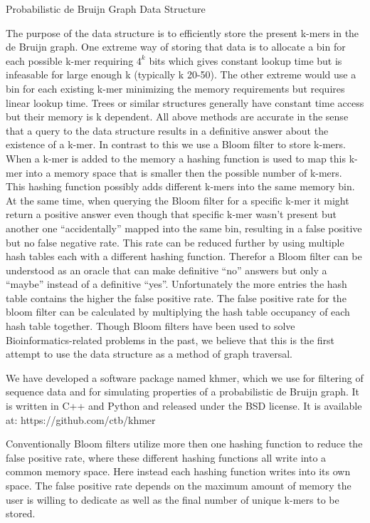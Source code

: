 \documentclass[12pt]{article} \usepackage{simplemargins}
\begin{document}
Probabilistic de Bruijn Graph Data Structure

The purpose of the data structure is to efficiently store the present
k-mers in the de Bruijn graph. One extreme way of storing that data is
to allocate a bin for each possible k-mer requiring $4^k$ bits which
gives constant lookup time but is infeasable for large enough k
(typically k 20-50). The other extreme would use a bin for each
existing k-mer minimizing the memory requirements but requires linear
lookup time. Trees or similar structures generally have constant time
access but their memory is k dependent. All above methods are accurate
in the sense that a query to the data structure results in a
definitive answer about the existence of a k-mer.  In contrast to this
we use a Bloom filter to store k-mers. When a k-mer is added to the
memory a hashing function is used to map this k-mer into a memory
space that is smaller then the possible number of k-mers. This hashing
function possibly adds different k-mers into the same memory bin. At
the same time, when querying the Bloom filter for a specific k-mer it
might return a positive answer even though that specific k-mer wasn’t
present but another one “accidentally” mapped into the same bin,
resulting in a false positive but no false negative rate. This rate can
be reduced further by using multiple hash tables each with a different
hashing function. Therefor a Bloom filter can be understood as an
oracle that can make definitive “no” answers but only a “maybe”
instead of a definitive “yes”. Unfortunately the more entries the hash
table contains the higher the false positive rate. The false positive
rate for the bloom filter can be calculated by multiplying the hash
table occupancy of each hash table together. Though Bloom
filters have been used to solve Bioinformatics-related problems in the
past\cite{pmid20426693, pmid20472541, haskell}, 
we believe that this is the first attempt to use the data
structure as a method of graph traversal.

We have developed a software package named khmer, which we use for
filtering of sequence data and for simulating properties of a
probabilistic de Bruijn graph. It is written in C++ and Python and
released under the BSD license. It is available at:
https://github.com/ctb/khmer

Conventionally Bloom filters utilize more then one hashing function to
reduce the false positive rate, where these different hashing
functions all write into a common memory space. Here instead each
hashing function writes into its own space. The false positive rate
depends on the maximum amount of memory the user is willing to
dedicate as well as the final number of unique k-mers to be
stored.
\end{document}
